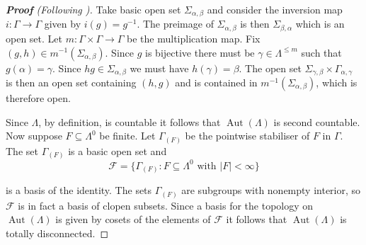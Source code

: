 \documentclass[12pt]{amsart}
\theoremstyle{definition}
\theoremstyle{remark}
\numberwithin{equation}{section}
\newcommand{\Aut}{\operatorname{Aut}}
\begin{document}
\begin{proof}[{\bf Proof} (Following {\cite[\S 1.3]{We}})]
Take basic open set $\Sigma_{\alpha, \beta}$ and consider the inversion map $i : \Gamma \to \Gamma$ given by $i(g)=g^{-1}$. The preimage of $\Sigma_{\alpha,\beta}$ is then $\Sigma_{\beta,\alpha}$ which is an open set. Let $m : \Gamma \times \Gamma \to \Gamma$ be the multiplication map. Fix $(g , h ) \in m^{-1} ( \Sigma_{\alpha,\beta} )$. Since $g$ is bijective there must be $\gamma \in \Lambda^{\le m}$ such that $g ( \alpha ) = \gamma$. Since $hg \in \Sigma_{\alpha,\beta}$ we must have $h ( \gamma ) = \beta$. The open set $\Sigma_{\gamma, \beta} \times \Gamma_{\alpha,\gamma}$ is then an open set containing $(h,g)$ and is contained in $m^{-1} ( \Sigma_{\alpha,\beta} )$, which is therefore open.

Since $\Lambda$, by definition, is countable it follows that $\Aut ( \Lambda )$ is second countable. Now suppose $F \subseteq \Lambda^0$ be finite. Let $\Gamma_{(F)}$ be the pointwise stabiliser of $F$ in $\Gamma$. The set $\Gamma_{(F)}$ is a basic open set and
\[
\mathcal{F} = \{ \Gamma_{(F)} : F \subseteq \Lambda^0 \text{ with } |F|<\infty \} 
\]

\noindent
is a basis of the identity. The sets $\Gamma_{(F)}$ are subgroups with nonempty interior, so $\mathcal{F}$ is in fact a basis of clopen subsets. Since a basis for the topology on $\Aut ( \Lambda )$ is given by cosets of the elements of $\mathcal{F}$ it follows that $\Aut ( \Lambda )$ is totally disconnected.
\end{proof}
\end{document}
